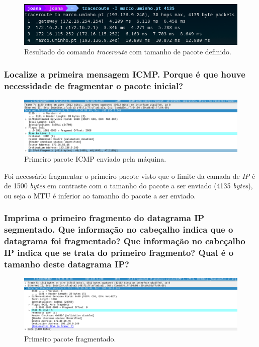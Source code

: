     \begin{figure}[H]
    \centering
    \includegraphics[width=400pt]{images/ParteI/Questao3/questao3-terminal.png}
    \caption{Resultado do comando \textit{traceroute} com tamanho de pacote definido.} \label{questao3-terminal}
    \end{figure}
    


\subsubsection{Localize a primeira mensagem ICMP. Porque é que houve necessidade de fragmentar o pacote inicial?}

    \begin{figure}[H]
    \centering
    \includegraphics[width=500pt]{images/ParteI/Questao3/questao3-UltimoSegmento.png}
    \caption{Primeiro pacote ICMP enviado pela máquina.} \label{questao3-ICMP}
    \end{figure}
    
    \par Foi necessário fragmentar o primeiro pacote visto que o limite da camada de \textit{IP} é de 1500 \textit{bytes} em contraste com o tamanho do pacote a ser enviado (4135 \textit{bytes}), ou seja o MTU é inferior ao tamanho do pacote a ser enviado.

\subsubsection{Imprima o primeiro fragmento do datagrama IP segmentado. Que informação no cabeçalho indica que o datagrama foi fragmentado? Que informação no cabeçalho IP indica que se trata do primeiro fragmento? Qual é o tamanho deste datagrama IP?}

    \begin{figure}[H]
    \centering
    \includegraphics[width=500pt]{images/ParteI/Questao3/questao3-firstSegmentado.png}
    \caption{Primeiro pacote fragmentado.} \label{questao3-primeiroSeg}
    \end{figure}
    
